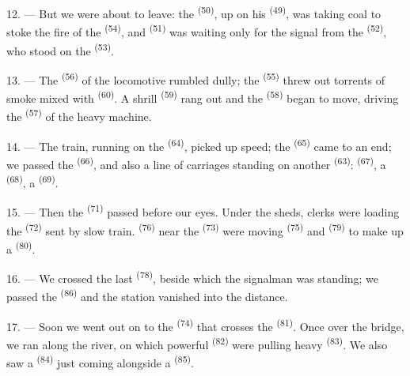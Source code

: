 12. --- But we were about to leave: the  \textsuperscript{(50)}, up on his
 \textsuperscript{(49)}, was taking coal to stoke the fire of the
 \textsuperscript{(54)}, and  \textsuperscript{(51)} was
waiting only for the signal from the  \textsuperscript{(52)},
who stood on the  \textsuperscript{(53)}.

13. --- The  \textsuperscript{(56)} of the locomotive rumbled dully; the
 \textsuperscript{(55)} threw out torrents of smoke mixed with
 \textsuperscript{(60)}. A shrill  \textsuperscript{(59)} rang out
and the  \textsuperscript{(58)} began to move, driving the
 \textsuperscript{(57)} of the heavy machine.

\VUsaut{3.0mm}
\VUsaut{3.0mm}

14. --- The train, running on the  \textsuperscript{(64)}, picked up speed; the
 \textsuperscript{(65)} came to an end; we passed the
 \textsuperscript{(66)}, and also a line of carriages standing on
another  \textsuperscript{(63)}:  \textsuperscript{(67)},
a
 \textsuperscript{(68)}, a  \textsuperscript{(69)}.


15. --- Then the  \textsuperscript{(71)} passed before our eyes. Under
the sheds, clerks were loading the  \textsuperscript{(72)} sent by slow train.
 \textsuperscript{(76)} near the  \textsuperscript{(73)}
were moving  \textsuperscript{(75)} and
 \textsuperscript{(79)} to make up a 
\textsuperscript{(80)}.

16. --- We crossed the last  \textsuperscript{(78)}, beside which the signalman
was standing; we passed the  \textsuperscript{(86)} and the station vanished
into the distance.

17. --- Soon we went out on to the  \textsuperscript{(74)} that crosses
the  \textsuperscript{(81)}. Once over the bridge, we ran along the river, on
which powerful  \textsuperscript{(82)} were pulling heavy
 \textsuperscript{(83)}. We also saw a 
\textsuperscript{(84)} just coming alongside a  \textsuperscript{(85)}.


